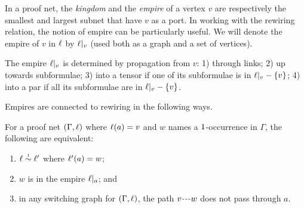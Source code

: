\documentclass{sigplanconf}
\begin{document}
%
%
%
%



In a proof net, the \emph{kingdom} and the \emph{empire} of a vertex $v$ are respectively the smallest and largest subnet that have $v$ as a port.
%
In working with the rewiring relation, the notion of empire can be particularly useful.
%
\color{red} 
We will denote the empire of $v$ in $\ell$ by $\emp v$ (used both as a graph and a set of vertices).
\color{black}


\begin{proposition}
\label{prop:empire propagation}
The empire $\emp v$ is determined by propagation from $v$: 1) through links; \color{red} 2) up towards subformulae; 3) into a tensor if one of its subformulae is in $\emp v-\{v\}$; 4) into a par if all its subformulae are in $\emp v-\{v\}$.%
\end{proposition}


Empires are connected to rewiring in the following ways.


\begin{lemma}
\label{lem:rewiring within empire}
For a proof net $(\Gamma,\ell)$ where $\ell(a)=v$ and $w$ names a $1$-occurrence in $\Gamma$, the following are equivalent:
%
\begin{enumerate}
	\item
$\links\perm*\links'$ where $\ell'(a)=w$;
	\item
$w$ is in the empire $\emp a$; and
	\item
in any switching graph for $(\Gamma,\ell)$, the path $\path vw$ does not pass through $a$.
\end{enumerate}
\end{lemma}
\end{document}
